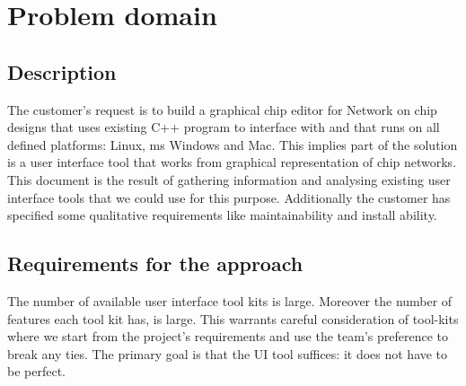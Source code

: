 \section{Problem domain}
\subsection{Description}

The customer's request is to build a graphical chip editor for Network on chip
designs that uses existing C++ program to interface with and that runs on all
defined platforms: Linux, ms Windows and Mac. This implies part of the solution
is a user interface tool that works from graphical representation of chip
networks. This document is the result of gathering information and analysing
existing user interface tools that we could use for this purpose. Additionally
the customer has specified some qualitative requirements like maintainability
and install ability.

\subsection{Requirements for the approach}

The number of available user interface tool kits is large.  Moreover the number
of features each tool kit has, is large. This warrants careful consideration of
tool-kits where we start from the project's requirements and use the team's
preference to break any ties.  The primary goal is that the UI tool suffices:
it does not have to be perfect.
